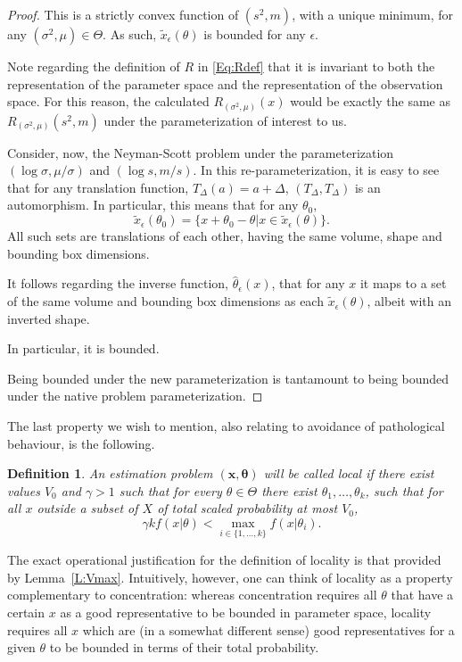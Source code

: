 \documentclass{IEEEtran}
\newtheorem{defi}{Definition}
\begin{document}
\begin{proof}
This is a strictly convex function of $(s^2,m)$, with a
unique minimum, for any $(\sigma^2,\mu)\in\Theta$. As such,
$\tilde{x}_\epsilon(\theta)$ is bounded for any $\epsilon$.

Note regarding the definition of $R$ in \eqref{Eq:Rdef} that it is invariant
to both the representation of the parameter space and the representation of
the observation space. For this reason, the calculated $R_{(\sigma^2,\mu)}(x)$
would be exactly the same as $R_{(\sigma^2,\mu)}(s^2,m)$ under the
parameterization of interest to us.

Consider, now, the Neyman-Scott problem under the
parameterization
$(\log \sigma,\mu/\sigma)$ and $(\log s,m/s)$. In this\linebreak
re-parameterization,
it is easy to see that for any translation function, $T_\Delta(a)=a+\Delta$, 
$(T_\Delta,T_\Delta)$ is an automorphism. In particular, this means that for
any $\theta_0$,
\[
\tilde{x}_\epsilon(\theta_0)=\{x+\theta_0-\theta|x\in\tilde{x}_\epsilon(\theta)\}.
\]
All such sets are translations of each other, having the same volume, shape and
bounding box dimensions.

It follows regarding the inverse function, $\hat{\theta}_{\epsilon}(x)$, that
for any $x$ it maps to a set of the same volume and bounding box dimensions
as each $\tilde{x}_\epsilon(\theta)$, albeit with an inverted shape.

In particular, it is bounded.

Being bounded under the new parameterization is tantamount to being bounded
under the native problem parameterization.
\end{proof}

The last property we wish to mention,
also relating to avoidance of pathological behaviour,
is the following.

\begin{defi}\label{D:local}
An estimation problem $(\mathbf{x},\boldsymbol{\theta})$
will be called \emph{local} if there exist values $V_0$ and $\gamma>1$ such that
for every $\theta\in\Theta$ there exist $\theta_1,\ldots,\theta_k$, such
that for all $x$ outside a subset of $X$ of total scaled probability at
most $V_0$,
\begin{equation}\label{Eq:local}
\gamma k f(x|\theta)<\max_{i\in\{1,\ldots,k\}} f(x|\theta_i).
\end{equation}
\end{defi}

The exact operational justification for the definition of locality is that
provided by Lemma~\ref{L:Vmax}.
Intuitively, however, one can think of locality as a property complementary to
concentration: whereas concentration requires all $\theta$ that have a certain
$x$ as a good representative to be bounded in parameter space, locality
requires all $x$ which are (in a somewhat different sense) good representatives
for a given $\theta$ to be bounded in terms of their total probability.
\end{document}
